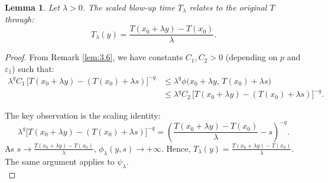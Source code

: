 \documentclass[
  sn-mathphys-num,
  colorlinks,
  linkcolor=darkmagenta,
  citecolor=rufous,
  urlcolor=zaffre,
  hypertexnames=false
]{sn-jnl}
\numberwithin{equation}{section}
\newtheorem{lemma}[theorem]{Lemma}%
\begin{document}
\begin{lemma}\label{lem:4.2}
Let $\lambda>0$. The scaled blow-up time \( T_\lambda \) relates to the original \( T \) through:
\begin{equation}
T_\lambda(y)
  =\frac{T(x_0+\lambda y)-T(x_0)}{\lambda}. 
  \label{fkk}
\end{equation}
\end{lemma}
\begin{proof}
From Remark \ref{lem:3.6}, we have constants \( C_1,C_2>0 \) (depending on \( p \) and \( \varepsilon_1 \)) such that:
$$
\begin{aligned}
\lambda^{q}C_1\,
  \bigl[ T(x_0 + \lambda y) - (T(x_0) + \lambda s) \bigr]^{-q}
&\leq \lambda^{q}\phi\bigl(x_0 + \lambda y,\, T(x_0) + \lambda s\bigr) \\[4pt]
&\leq \lambda^{q}C_2\,
  \bigl[ T(x_0 + \lambda y) - (T(x_0) + \lambda s) \bigr]^{-q}.
\end{aligned}
$$

The key observation is the scaling identity:
\begin{equation}
\lambda^{q}
  \bigl[T(x_0+\lambda y)-(T(x_0)+\lambda s)\bigr]^{-q}
= \left(\frac{T(x_0+\lambda y)-T(x_0)}{\lambda}-s\right)^{-q}.
\end{equation}
As $s \to \frac{T(x_0+\lambda y)-T(x_0)}{\lambda}$, $\phi_\lambda(y,s)\to +\infty$. Hence, $T_\lambda(y)=\frac{T(x_0+\lambda y)-T(x_0)}{\lambda}$.
The same argument applies to \(\psi_\lambda\).\\
\end{proof}
\end{document}
